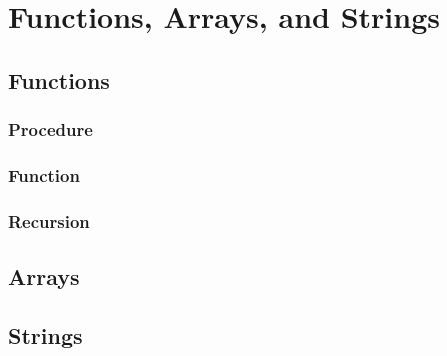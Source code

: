 \chapter{Functions, Arrays, and Strings}

\section{Functions}

\subsection{Procedure}

\subsection{Function}

\subsection{Recursion}

\section{Arrays}

\section{Strings}
